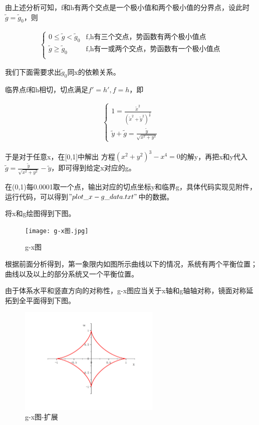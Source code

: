 \documentclass[10pt, a4paper]{article}
\newcommand{\wx}{\widetilde{x}}
\newcommand{\wy}{\widetilde{y}}
\newcommand{\wg}{\widetilde{g}}
\begin{document}
    由上述分析可知，f和h有两个交点是一个极小值和两个极小值的分界点，设此时$\wg=\wg_0$，则

    \begin{align}
        \begin{cases}
            0\le\wg<\wg_0 & \text{f,h有三个交点，势函数有两个极小值点}\\
            \wg\ge\wg_0 & \text{f,h有一或两个交点，势函数有一个极小值点}\\
        \end{cases}
    \end{align}

    我们下面需要求出$\wg_0$同x的依赖关系。

    临界点f和h相切，切点满足$f'=h',f=h$，即
    
    \begin{align}
        \begin{cases}
            1=\frac{\wx^2}{(\wx^2+\wy^2)^\frac{3}{2}}\\
            \wy+\wg=\frac{\wy}{\sqrt{x^2+y^2}}
        \end{cases}
    \end{align}\label{第一问切点方程}
    
    于是对于任意x，在[0,1]中解出
    方程$(x^2+y^2)^3-x^4=0$的解y，再把x和y代入$\wg=\frac{\wy}{\sqrt{x^2+y^2}}-\wy$，即可得到给定x对应的g。

    在(0,1)每0.0001取一个点，输出对应的切点坐标y和临界g，具体代码实现见附件，运行代码，可以得到$"plot\_x-g\_data.txt"$中的数据。
    
    将x和g绘图得到下图。

    \begin{figure}[H]
        \centering
        \texttt{[image: g-x图.jpg]}
        \caption{g-x图}\label{g-x图}
    \end{figure}

    根据前面分析得到，第一象限内如图所示曲线以下的情况，系统有两个平衡位置；曲线以及以上的部分系统又一个平衡位置。

    由于体系水平和竖直方向的对称性，g-x图应当关于x轴和g轴轴对称，镜面对称延拓到全平面得到下图。

    \begin{figure}[H]
        \centering
        \includegraphics[width=0.6\textwidth]{g-x图-扩展.jpg}
        \caption{g-x图-扩展}\label{g-x图-扩展}
    \end{figure}
\end{document}
